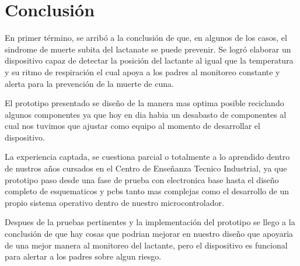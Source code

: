 \section{Conclusión}
En primer término, se arribó a la conclusión de que, en algunos de los casos, el sindrome de muerte subita del lactanate se puede prevenir.
Se logró elaborar un dispositivo capaz de detectar la posición del lactante al igual que la temperatura y su ritmo de respiración el cual apoya a los padres al monitoreo constante y alerta para la prevención de la muerte de cuna.

El prototipo presentado se diseño de la manera mas optima posible reciclando algunos componentes ya que hoy en dia habia un desabasto de componentes al cual nos tuvimos que ajustar como equipo al momento de desarrollar el dispositivo.

La experiencia captada, se cuestiona parcial o totalmente a lo aprendido dentro de nustros años cursados en el Centro de Enseñanza Tecnico Industrial,
ya que prototipo paso desde una fase de prueba con electronica base hasta el diseño completo de esquematicos y pcbs tanto mas complejas como el desarrollo de un propio sistema operativo dentro de nuestro microcontrolador.

Despues de la pruebas pertinentes y la implementación del prototipo se llego a la conclusión de que hay cosas que podrian mejorar en nuestro diseño que apoyaria de una mejor manera al monitoreo del lactante, pero el dispositivo es funcional para alertar a los padres sobre algun riesgo.
